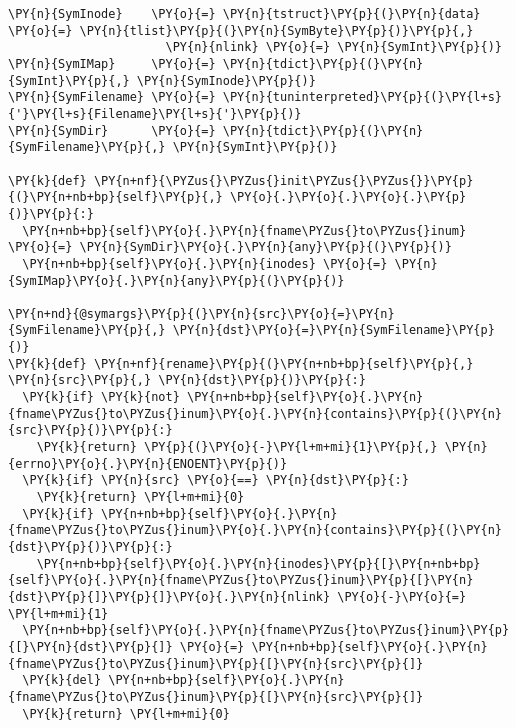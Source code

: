 \begin{Verbatim}[commandchars=\\\{\}]
\PY{n}{SymInode}    \PY{o}{=} \PY{n}{tstruct}\PY{p}{(}\PY{n}{data}  \PY{o}{=} \PY{n}{tlist}\PY{p}{(}\PY{n}{SymByte}\PY{p}{)}\PY{p}{,}
                      \PY{n}{nlink} \PY{o}{=} \PY{n}{SymInt}\PY{p}{)}
\PY{n}{SymIMap}     \PY{o}{=} \PY{n}{tdict}\PY{p}{(}\PY{n}{SymInt}\PY{p}{,} \PY{n}{SymInode}\PY{p}{)}
\PY{n}{SymFilename} \PY{o}{=} \PY{n}{tuninterpreted}\PY{p}{(}\PY{l+s}{'}\PY{l+s}{Filename}\PY{l+s}{'}\PY{p}{)}
\PY{n}{SymDir}      \PY{o}{=} \PY{n}{tdict}\PY{p}{(}\PY{n}{SymFilename}\PY{p}{,} \PY{n}{SymInt}\PY{p}{)}

\PY{k}{def} \PY{n+nf}{\PYZus{}\PYZus{}init\PYZus{}\PYZus{}}\PY{p}{(}\PY{n+nb+bp}{self}\PY{p}{,} \PY{o}{.}\PY{o}{.}\PY{o}{.}\PY{p}{)}\PY{p}{:}
  \PY{n+nb+bp}{self}\PY{o}{.}\PY{n}{fname\PYZus{}to\PYZus{}inum} \PY{o}{=} \PY{n}{SymDir}\PY{o}{.}\PY{n}{any}\PY{p}{(}\PY{p}{)}
  \PY{n+nb+bp}{self}\PY{o}{.}\PY{n}{inodes} \PY{o}{=} \PY{n}{SymIMap}\PY{o}{.}\PY{n}{any}\PY{p}{(}\PY{p}{)}

\PY{n+nd}{@symargs}\PY{p}{(}\PY{n}{src}\PY{o}{=}\PY{n}{SymFilename}\PY{p}{,} \PY{n}{dst}\PY{o}{=}\PY{n}{SymFilename}\PY{p}{)}
\PY{k}{def} \PY{n+nf}{rename}\PY{p}{(}\PY{n+nb+bp}{self}\PY{p}{,} \PY{n}{src}\PY{p}{,} \PY{n}{dst}\PY{p}{)}\PY{p}{:}
  \PY{k}{if} \PY{k}{not} \PY{n+nb+bp}{self}\PY{o}{.}\PY{n}{fname\PYZus{}to\PYZus{}inum}\PY{o}{.}\PY{n}{contains}\PY{p}{(}\PY{n}{src}\PY{p}{)}\PY{p}{:}
    \PY{k}{return} \PY{p}{(}\PY{o}{-}\PY{l+m+mi}{1}\PY{p}{,} \PY{n}{errno}\PY{o}{.}\PY{n}{ENOENT}\PY{p}{)}
  \PY{k}{if} \PY{n}{src} \PY{o}{==} \PY{n}{dst}\PY{p}{:}
    \PY{k}{return} \PY{l+m+mi}{0}
  \PY{k}{if} \PY{n+nb+bp}{self}\PY{o}{.}\PY{n}{fname\PYZus{}to\PYZus{}inum}\PY{o}{.}\PY{n}{contains}\PY{p}{(}\PY{n}{dst}\PY{p}{)}\PY{p}{:}
    \PY{n+nb+bp}{self}\PY{o}{.}\PY{n}{inodes}\PY{p}{[}\PY{n+nb+bp}{self}\PY{o}{.}\PY{n}{fname\PYZus{}to\PYZus{}inum}\PY{p}{[}\PY{n}{dst}\PY{p}{]}\PY{p}{]}\PY{o}{.}\PY{n}{nlink} \PY{o}{-}\PY{o}{=} \PY{l+m+mi}{1}
  \PY{n+nb+bp}{self}\PY{o}{.}\PY{n}{fname\PYZus{}to\PYZus{}inum}\PY{p}{[}\PY{n}{dst}\PY{p}{]} \PY{o}{=} \PY{n+nb+bp}{self}\PY{o}{.}\PY{n}{fname\PYZus{}to\PYZus{}inum}\PY{p}{[}\PY{n}{src}\PY{p}{]}
  \PY{k}{del} \PY{n+nb+bp}{self}\PY{o}{.}\PY{n}{fname\PYZus{}to\PYZus{}inum}\PY{p}{[}\PY{n}{src}\PY{p}{]}
  \PY{k}{return} \PY{l+m+mi}{0}
\end{Verbatim}
